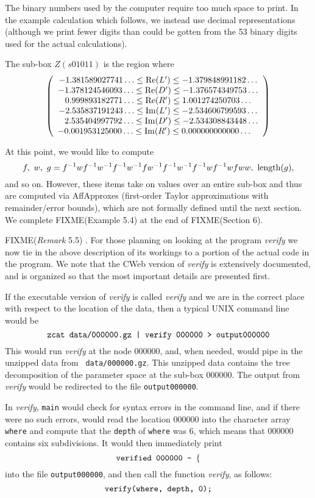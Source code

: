 The binary numbers used by the computer require too much space to print.
In the example calculation which follows, we instead use decimal 
representations (although we print fewer digits than could
be gotten from the 53 binary digits used for the actual calculations).

The sub-box $Z(s01011)$ is the region where 
$$\left(\begin{array}{c} 
-1.381589027741\ldots  \le  {\rm Re}(L')  \le  -1.379848991182\ldots\cr
-1.378124546093\ldots  \le  {\rm Re}(D')  \le  -1.376574349753\ldots\cr
0.999893182771\ldots  \le {\rm Re}(R')  \le  1.001274250703\ldots\cr
-2.535837191243\ldots  \le  {\rm Im}(L')  \le  -2.534606799593\ldots\cr
\phantom{-}2.535404997792\ldots  \le  {\rm Im}(D')  \le  -2.534308843448\ldots\cr
-0.001953125000\ldots  \le  {\rm Im}(R')  \le  0.000000000000\ldots\phantom{-}\cr
\end{array}\right)$$


At this point, we would like to compute $$f,\ w,\ g = f^{-1}wf^{-1}w^{-1}f^{-1}w^{-1}fw^{-1}f^{-1}w^{-1}f^{-1}wf^{-1}wfww, \ {\rm length}(g),$$ 
\noindent 
and so on.  
However, these items take on values over an entire sub-box and thus are computed via AffApproxes (first-order Taylor
approximations with remainder/error bounds), which are not formally defined until the next section.  We
complete
FIXME(Example 5.4)
 at the end of 
FIXME(Section 6).

FIXME({\it Remark} 5.5)
.  For those planning on looking at the program {\it verify}
we now tie in the above description of its workings to a portion of the actual code in the program.  We note that the CWeb version of {\it verify} is extensively documented, and is organized so that the most important details are presented first.

If the executable version of {\it verify} is called {\it verify} and we are in the correct place with respect to the location of the data, then a typical UNIX command line would be 
$$
\hbox{\tt zcat data/000000.gz | verify 000000 > output000000} 
$$
This would run {\it verify} at the node 000000, and, when needed, would pipe in the unzipped data from \hbox{\tt
data/000000.gz}.  This unzipped data contains the tree decomposition of the parameter space at the sub-box 000000. 
The output from {\it verify} would be redirected to the file \hbox{\tt output000000}.

In {\it verify}, \hbox{\tt main} would check for syntax errors in the command line, and if there were no such errors, would read the location 000000 into the character array \hbox{\tt where}  and compute that the \hbox{\tt depth} of \hbox{\tt where} was 6, which means that 000000 contains
six subdivisions.   It would then immediately print 
$$
\hbox{\tt verified 000000 - } \{$$
into the file \hbox{\tt output000000}, and then call the function {\it verify}, as follows:
$$
\hbox{\tt verify(where, depth, 0);}
$$

